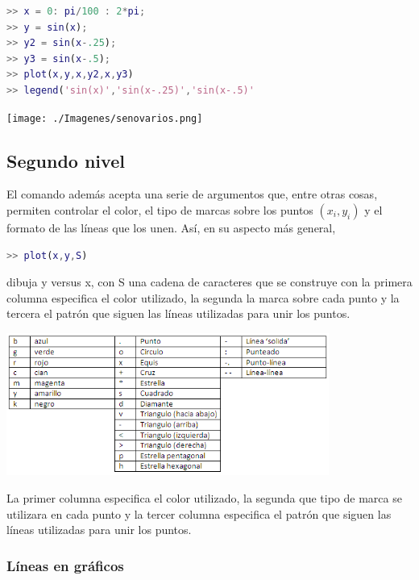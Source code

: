 \begin{lstlisting}[language=Matlab]
>> x = 0: pi/100 : 2*pi; 
>> y = sin(x);
>> y2 = sin(x-.25); 
>> y3 = sin(x-.5); 
>> plot(x,y,x,y2,x,y3)
>> legend('sin(x)','sin(x-.25)','sin(x-.5)'
\end{lstlisting}
\begin{center}
\texttt{[image: ./Imagenes/senovarios.png]}
\end{center}


\subsection{Segundo nivel}

El comando además acepta una serie de argumentos que, entre otras cosas, permiten controlar el color, el tipo de marcas sobre los puntos $(x_{i}, y_{i})$ y el formato de las líneas que los unen. Así, en su aspecto más general,

\begin{lstlisting}[language=Matlab]
>> plot(x,y,S)
\end{lstlisting}

dibuja y versus x, con S una cadena de caracteres que se construye con la primera columna especifica el color utilizado, la segunda la marca sobre cada punto y la tercera el patrón que siguen las líneas utilizadas para unir los puntos.

\begin{center}
\includegraphics[width=300pt]{./Imagenes/comandosbasicos1.png}
\end{center}

La primer columna especifica el color utilizado, la segunda que tipo de marca se utilizara en cada punto y la tercer columna especifica el patrón que siguen las líneas utilizadas para unir los puntos.

\subsubsection{Líneas en gráficos}

